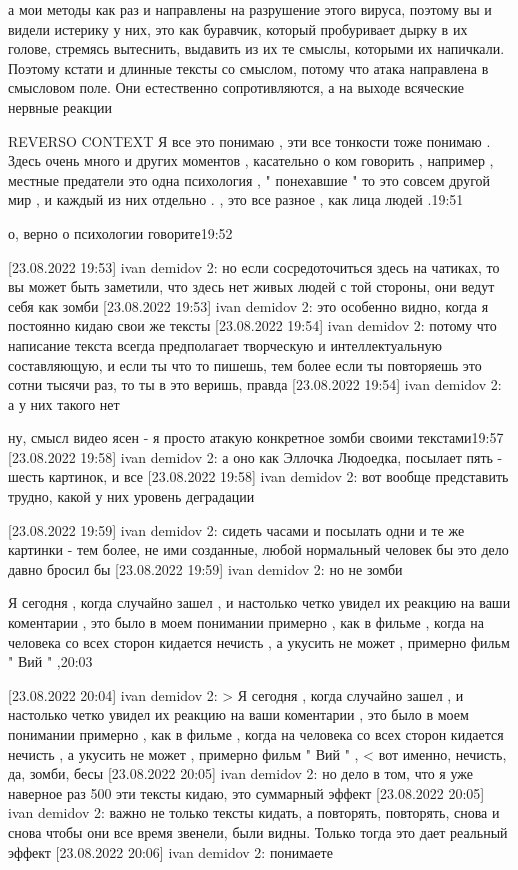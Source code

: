 а мои методы как раз и направлены на разрушение этого вируса, поэтому вы и
видели истерику у них, это как буравчик, который пробуривает дырку в их голове,
стремясь вытеснить, выдавить из их те смыслы, которыми их напичкали. Поэтому
кстати и длинные тексты со смыслом, потому что атака направлена в смысловом
поле. Они естественно сопротивляются, а на выходе всяческие нервные реакции

REVERSO CONTEXT
Я все это понимаю , эти все тонкости тоже понимаю . Здесь очень много и других
моментов , касательно о ком говорить , например , местные предатели это одна
психология , " понехавшие " то это совсем другой мир , и каждый из них отдельно
. , это все разное , как лица людей .19:51

о, верно о психологии говорите19:52

[23.08.2022 19:53] ivan demidov 2: но если сосредоточиться здесь на чатиках, то вы может быть заметили, что здесь нет живых людей с той стороны, они ведут себя как зомби
[23.08.2022 19:53] ivan demidov 2: это особенно видно, когда я постоянно кидаю свои же тексты
[23.08.2022 19:54] ivan demidov 2: потому что написание текста всегда предполагает творческую и интеллектуальную составляющую, и если ты что то пишешь, тем более если ты повторяешь это сотни тысячи раз, то ты в это веришь, правда
[23.08.2022 19:54] ivan demidov 2: а у них такого нет

ну, смысл видео ясен - я просто атакую конкретное зомби своими текстами19:57
[23.08.2022 19:58] ivan demidov 2: а оно как Эллочка Людоедка, посылает пять - шесть картинок, и все
[23.08.2022 19:58] ivan demidov 2: вот вообще представить трудно, какой у них уровень деградации

[23.08.2022 19:59] ivan demidov 2: сидеть часами и посылать одни и те же картинки - тем более, не ими созданные, любой нормальный человек бы это дело давно бросил бы
[23.08.2022 19:59] ivan demidov 2: но не зомби

Я сегодня , когда случайно зашел , и настолько четко увидел их реакцию на ваши
коментарии , это было в моем понимании примерно , как в фильме , когда на
человека со всех сторон кидается нечисть , а укусить не может , примерно фильм
" Вий " ,20:03

[23.08.2022 20:04] ivan demidov 2: 
> Я сегодня , когда случайно зашел , и настолько четко увидел их реакцию на ваши коментарии , это было в моем понимании примерно , как в фильме , когда на человека со всех сторон кидается нечисть , а укусить не может , примерно фильм " Вий " , <
вот именно, нечисть, да, зомби, бесы
[23.08.2022 20:05] ivan demidov 2: но дело в том, что я уже наверное раз 500 эти тексты кидаю, это суммарный эффект
[23.08.2022 20:05] ivan demidov 2: важно не только тексты кидать, а повторять, повторять, снова и снова чтобы они все время звенели, были видны. Только тогда это дает реальный эффект
[23.08.2022 20:06] ivan demidov 2: понимаете
